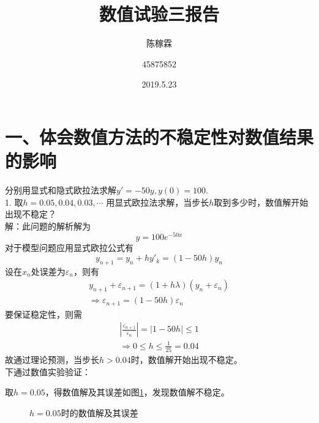 \documentclass[10pt,a4paper]{article}
\title{数值试验三报告}
\author{陈稼霖 \and 45875852}
\date{2019.5.23}
\begin{document}
\maketitle
\section*{一、体会数值方法的不稳定性对数值结果的影响}
分别用显式和隐式欧拉法求解$y'=-50y,y(0)=100$.\\
1. 取$h=0.05,0.04,0.03,\cdots$ 用显式欧拉法求解，当步长$h$取到多少时，数值解开始出现不稳定？\\
解：此问题的解析解为
\[
y=100e^{-50x}
\]
对于模型问题应用显式欧拉公式有
\[
y_{n+1}=y_n+hy'_k=(1-50h)y_n
\]
设在$x_n$处误差为$\varepsilon_n$，则有
\begin{gather*}
y_{n+1}+\varepsilon_{n+1}=(1+h\lambda)(y_n+\varepsilon_n)\\
\Longrightarrow\varepsilon_{n+1}=(1-50h)\varepsilon_n
\end{gather*}
要保证稳定性，则需
\begin{gather*}
|\frac{\varepsilon_{n+1}}{\varepsilon_n}|=|1-50h|\leq1\\
\Longrightarrow0\leq h\leq\frac{1}{25}=0.04
\end{gather*}
故通过理论预测，当步长$h>0.04$时，数值解开始出现不稳定。\\
下通过数值实验验证：

取$h=0.05$，得数值解及其误差如图\ref{1_1_1}，发现数值解不稳定。
\begin{figure}[ht]
\centering
{}
\caption{$h=0.05$时的数值解及其误差}\label{1_1_1}
\end{figure}
\newpage
\end{document}
